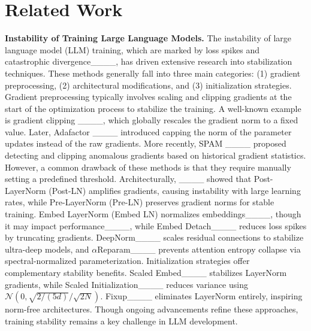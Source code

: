 \section{Related Work}
\textbf{Instability of Training Large Language Models.} 
The instability of large language model (LLM) training, which are marked by loss spikes and catastrophic divergence____, has driven extensive research into stabilization techniques. These methods generally fall into three main categories: (1) gradient preprocessing, (2) architectural modifications, and (3) initialization strategies. Gradient preprocessing typically involves scaling and clipping gradients at the start of the optimization process to stabilize the training. A well-known example is gradient clipping ____, which globally rescales  the gradient norm to a fixed value. Later, Adafactor ____ introduced capping the norm of the parameter updates instead of the raw gradients. More recently, SPAM ____ proposed detecting and clipping anomalous gradients based on historical gradient statistics. However, a common drawback of these methods is that they require manually setting a predefined threshold. Architecturally, ____ showed that Post-LayerNorm (Post-LN) amplifies gradients, causing instability with large learning rates, while Pre-LayerNorm (Pre-LN) preserves gradient norms for stable training. Embed LayerNorm (Embed LN) normalizes embeddings____, though it may impact performance____, while Embed Detach____ reduces loss spikes by truncating gradients. DeepNorm____ scales residual connections to stabilize ultra-deep models, and $\alpha$Reparam____ prevents attention entropy collapse via spectral-normalized parameterization. Initialization strategies offer complementary stability benefits. Scaled Embed____ stabilizes LayerNorm gradients, while Scaled Initialization____ reduces variance using $\mathcal{N}(0, \sqrt{2/(5d)}/\sqrt{2N})$. Fixup____ eliminates LayerNorm entirely, inspiring norm-free architectures. Though ongoing advancements refine these approaches, training stability remains a key challenge in LLM development.



